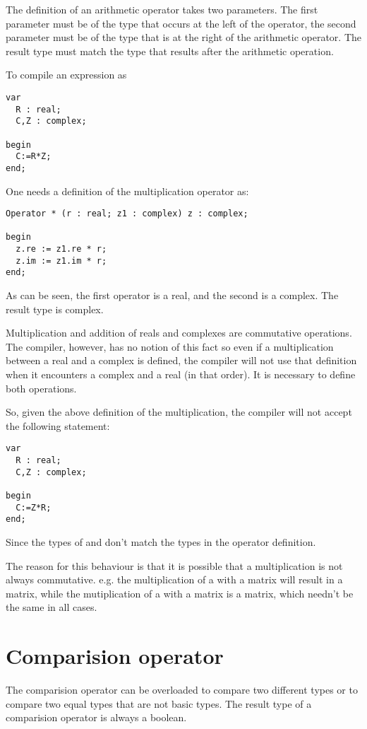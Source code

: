 The definition of an arithmetic operator takes two parameters. The first
parameter must be of the type that occurs at the left of the operator,
the second parameter must be of the type that is at the right of the
arithmetic operator. The result type must match the type that results
after the arithmetic operation.

To compile an expression as
\begin{verbatim}
var
  R : real;
  C,Z : complex;

begin
  C:=R*Z;
end;
\end{verbatim}
One needs a definition of the multiplication operator as:
\begin{verbatim}
Operator * (r : real; z1 : complex) z : complex;

begin
  z.re := z1.re * r;
  z.im := z1.im * r;
end;
\end{verbatim}
As can be seen, the first operator is a real, and the second is
a complex. The result type is complex.

Multiplication and addition of reals and complexes are commutative
operations. The compiler, however, has no notion of this fact so even
if a multiplication between a real and a complex is defined, the
compiler will not use that definition when it encounters a complex
and a real (in that order). It is necessary to define both operations.

So, given the above definition of the multiplication,
the compiler will not accept the following statement:
\begin{verbatim}
var
  R : real;
  C,Z : complex;

begin
  C:=Z*R;
end;
\end{verbatim}
Since the types of  and  don't match the types in the
operator definition.

The reason for this behaviour is that it is possible that a multiplication
is not always commutative. e.g. the multiplication of a  with a
 matrix will result in a  matrix, while the
mutiplication of a  with a  matrix is a 
matrix, which needn't be the same in all cases.

\section{Comparision operator}
The comparision operator can be overloaded to compare two different types
or to compare two equal types that are not basic types. The result type of
a comparision operator is always a boolean.

